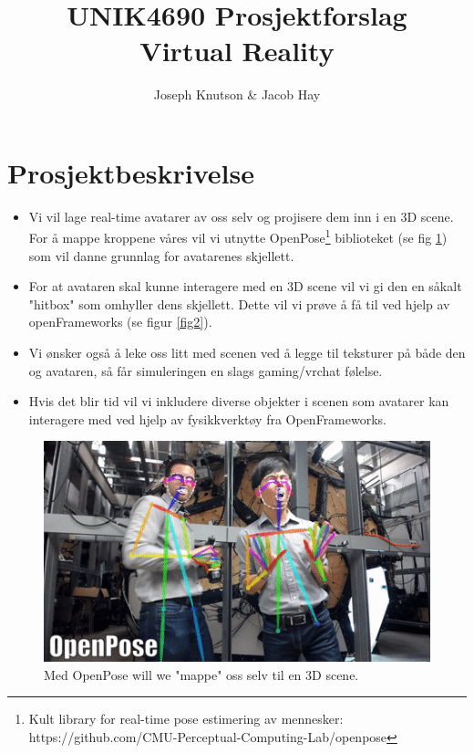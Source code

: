 \documentclass[a4paper,10pt]{article}
\title{UNIK4690 Prosjektforslag\\ Virtual Reality}
\author{Joseph Knutson \& Jacob Hay}
\begin{document}
\maketitle
\section*{Prosjektbeskrivelse}
\begin{itemize}
\item Vi vil lage real-time avatarer av oss selv og projisere dem inn i en 3D scene. For å mappe kroppene våres vil vi utnytte OpenPose\footnote[1]{Kult library for real-time pose estimering av mennesker: https://github.com/CMU-Perceptual-Computing-Lab/openpose} biblioteket (se fig \ref{fig1}) som vil danne grunnlag for avatarenes skjellett.
\item For at avataren skal kunne interagere med en 3D scene vil vi gi den en såkalt "hitbox" som omhyller dens skjellett. Dette vil vi prøve å få til ved hjelp av openFrameworks (se figur \ref{fig2}).
\item Vi ønsker også å leke oss litt med scenen ved å legge til teksturer på både den og avataren, så får simuleringen en slags gaming/vrchat følelse.
\item Hvis det blir tid vil vi inkludere diverse objekter i scenen som avatarer kan interagere med ved hjelp av fysikkverktøy fra OpenFrameworks.
\end{itemize}
\clearpage

% 


\begin{figure}\centering
 \includegraphics[width = 0.8\linewidth]{openpose}
 \caption{Med OpenPose will we "mappe" oss selv til en 3D scene.}
 \label{fig1}
\end{figure}
\end{document}
